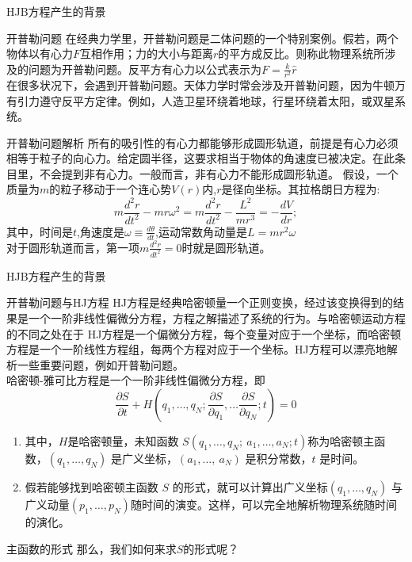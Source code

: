 \begin{frame}{HJB方程产生的背景}
\small 
\begin{block}{开普勒问题}
在经典力学里，开普勒问题是二体问题的一个特别案例。假若，两个物体以有心力$F$互相作用；力的大小与距离$r$的平方成反比。则称此物理系统所涉及的问题为开普勒问题。反平方有心力以公式表示为$F=\frac{k}{r^2} \hat{r}$
\\ 
在很多状况下，会遇到开普勒问题。天体力学时常会涉及开普勒问题，因为牛顿万有引力遵守反平方定律。例如，人造卫星环绕着地球，行星环绕着太阳，或双星系统。

\end{block}
\begin{block}{开普勒问题解析}
所有的吸引性的有心力都能够形成圆形轨道，前提是有心力必须相等于粒子的向心力。给定圆半径，这要求相当于物体的角速度已被决定。在此条目里，不会提到非有心力。一般而言，非有心力不能形成圆形轨道。
假设，一个质量为$m$的粒子移动于一个连心势$V(r)$内,$r$是径向坐标。其拉格朗日方程为:
$$
m \frac{d^2r}{dt^2}-mr\omega^2=m\frac{d^2r}{dt^2}-\frac{L^2}{mr^3}=-\frac{dV}{dr};
$$
其中，时间是$t$,角速度是$\omega \equiv \frac{d\theta}{dt}$,运动常数角动量是$L=mr^2\omega$\\
对于圆形轨道而言，第一项$m \frac{d^2r}{dt^2}=0$时就是圆形轨道。
\end{block}
\end{frame}

\begin{frame}{HJB方程产生的背景}
\small
\begin{block}{开普勒问题与HJ方程}
HJ方程是经典哈密顿量一个正则变换，经过该变换得到的结果是一个一阶非线性偏微分方程，方程之解描述了系统的行为。与哈密顿运动方程的不同之处在于 HJ方程是一个偏微分方程，每个变量对应于一个坐标，而哈密顿方程是一个一阶线性方程组，每两个方程对应于一个坐标。HJ方程可以漂亮地解析一些重要问题，例如开普勒问题。\\哈密顿-雅可比方程是一个一阶非线性偏微分方程，即
$$
\frac{\partial S}{\partial t}+H(q_1,\dots, q_N;\frac{\partial S}{\partial q_1},\dots \frac{\partial S}{\partial q_N};t)=0
$$
\begin{enumerate}
\item 其中，$H$是哈密顿量，未知函数 $ S(q_{1}, \dots , q_{N};\ a_{1},\dots ,a_{N}; t)$称为哈密顿主函数，$ (q_{1}, \dots , q_{N})$ 是广义坐标，$ (a_{1},\dots ,\ a_{N})$ 是积分常数，$t$ 是时间。\\
\item 假若能够找到哈密顿主函数 $S$ 的形式，就可以计算出广义坐标$ (q_{1}, \dots , q_{N})$ 与广义动量$ (p_{1},\dots , p_{N})$随时间的演变。这样，可以完全地解析物理系统随时间的演化。
\end{enumerate}
 
\end{block}

\begin{block}{主函数的形式}
那么，我们如何来求$S$的形式呢？

\end{block}
\end{frame}

